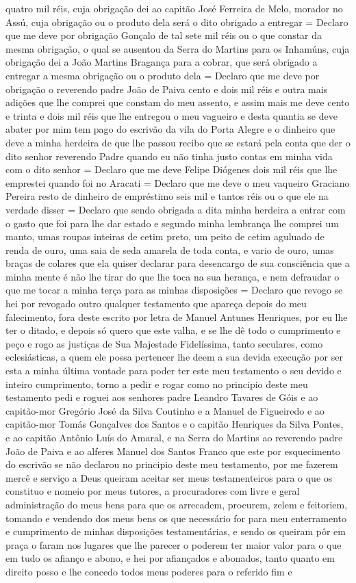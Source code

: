 \begin{refsection}
quatro mil réis, cuja obrigação dei ao capitão José Ferreira de Melo, morador no Assú, cuja obrigação ou o produto dela será o dito obrigado a entregar = Declaro que me deve por obrigação Gonçalo de tal sete mil réis ou o que constar da mesma obrigação, o qual se ausentou da Serra do Martins para os Inhamúns, cuja obrigação dei a João Martins Bragança para a cobrar, que será obrigado a entregar a mesma obrigação ou o produto dela = Declaro que me deve por obrigação o reverendo padre João de Paiva cento e dois mil réis e outra mais adições que lhe comprei que constam do meu assento, e assim mais me deve cento e trinta e dois mil réis que lhe entregou o meu vagueiro e desta quantia se deve abater por mim tem pago do escrivão da vila do Porta Alegre e o dinheiro que deve a minha herdeira de que lhe passou recibo que se estará pela conta que der o dito senhor reverendo Padre quando eu não tinha justo contas em minha vida com o dito senhor = Declaro que me deve Felipe Diógenes dois mil réis que lhe emprestei quando foi no Aracati = Declaro que me deve o meu vaqueiro Graciano Pereira resto de dinheiro de empréstimo seis mil e tantos réis ou o que ele na verdade disser = Declaro que sendo obrigada a dita minha herdeira a entrar com o gasto que foi para lhe dar estado e segundo minha lembrança lhe comprei um manto, umas roupas inteiras de cetim preto, um peito de cetim aguluado de renda de ouro, uma saia de seda amarela de toda conta, e vario de ouro, umas braças de colares que ela quiser declarar para desencargo de sua consciência que a minha mente é não lhe tirar do que lhe toca na sua herança, e nem defraudar o que me tocar a minha terça para as minhas disposições = Declaro que revogo se hei por revogado outro qualquer testamento que apareça depois do meu falecimento, fora deste escrito por letra de Manuel Antunes Henriques, por eu lhe ter o ditado, e depois só quero que este valha, e se lhe dê todo o cumprimento e peço e rogo as justiças de Sua Majestade Fidelíssima, tanto seculares, como eclesiásticas, a quem ele possa pertencer lhe deem a sua devida execução por ser esta a minha última vontade para poder ter este meu testamento o seu devido e inteiro cumprimento, torno a pedir e rogar como no principio deste meu testamento pedi e roguei aos senhores padre Leandro Tavares de Góis e ao capitão-mor Gregório José da Silva Coutinho e a Manuel de Figueiredo e ao capitão-mor Tomás Gonçalves dos Santos e o capitão Henriques da Silva Pontes, e ao capitão Antônio Luís do Amaral, e na Serra do Martins  ao reverendo padre João de Paiva e ao alferes Manuel dos Santos Franco que este por esquecimento do escrivão se não declarou no principio deste meu testamento, por me fazerem mercê e serviço a Deus queiram aceitar ser meus testamenteiros para o que os constituo e nomeio por meus tutores, a procuradores com livre e geral administração do meus bens para que os arrecadem, procurem, zelem e feitoriem, tomando e vendendo dos meus bens os que necessário for para meu enterramento e cumprimento de minhas disposições testamentárias, e sendo os queiram pôr em praça o faram nos lugares que lhe parecer o poderem ter maior valor para o que  em tudo os afianço e abono, e hei por afiançados e abonados, tanto quanto em direito posso e lhe concedo todos meus poderes para o referido fim e 
\end{refsection}
